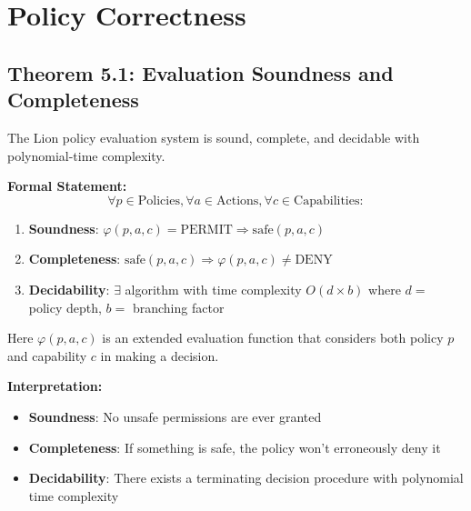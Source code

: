 \tableofcontents

\section{Policy Correctness}

\subsection{Theorem 5.1: Evaluation Soundness and Completeness}

\begin{theorem}
\label{thm:policy-correctness}
The Lion policy evaluation system is sound, complete, and decidable with polynomial-time complexity.
\end{theorem}

\textbf{Formal Statement:}
$$\forall p \in \text{Policies}, \forall a \in \text{Actions}, \forall c \in \text{Capabilities}:$$

\begin{enumerate}
\item \textbf{Soundness}: $\varphi(p,a,c) = \text{PERMIT} \Rightarrow \text{safe}(p,a,c)$
\item \textbf{Completeness}: $\text{safe}(p,a,c) \Rightarrow \varphi(p,a,c) \neq \text{DENY}$
\item \textbf{Decidability}: $\exists$ algorithm with time complexity $O(d \times b)$ where $d = $ policy depth, $b = $ branching factor
\end{enumerate}

Here $\varphi(p,a,c)$ is an extended evaluation function that considers both policy $p$ and capability $c$ in making a decision.

\textbf{Interpretation:}
\begin{itemize}
\item \textbf{Soundness}: No unsafe permissions are ever granted
\item \textbf{Completeness}: If something is safe, the policy won't erroneously deny it
\item \textbf{Decidability}: There exists a terminating decision procedure with polynomial time complexity
\end{itemize}


